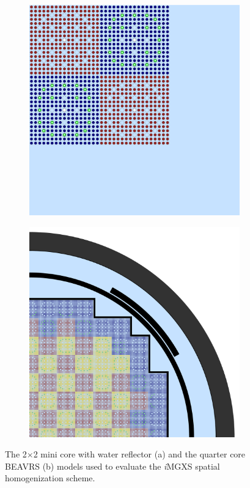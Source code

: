 \documentclass[12pt,twoside]{mitthesis-exec}
\begin{document}
\begin{figure}[h!]
\centering
\begin{subfigure}{0.47\textwidth}
  \centering
  \includegraphics[width=0.93\linewidth]{figures/benchmarks/reflector}
  \caption{}
  \label{fig:reflector}
\end{subfigure}%
\begin{subfigure}{0.47\textwidth}
  \centering
  \includegraphics[width=0.93\linewidth]{figures/benchmarks/quarter-core}
  \caption{}
  \label{fig:full-core}
\end{subfigure}
\caption[PWR benchmarks]{The 2$\times$2 mini core with water reflector (a) and the quarter core BEAVRS (b) models used to evaluate the \textit{i}MGXS spatial homogenization scheme.}
\label{fig:benchmarks}
\end{figure}
\end{document}
